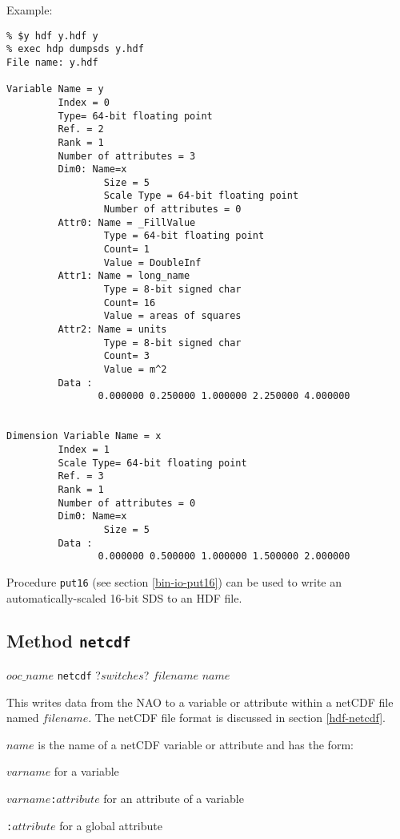 Example:
  \begin{verbatim}
% $y hdf y.hdf y
% exec hdp dumpsds y.hdf
File name: y.hdf 

Variable Name = y
         Index = 0
         Type= 64-bit floating point
         Ref. = 2
         Rank = 1
         Number of attributes = 3
         Dim0: Name=x
                 Size = 5
                 Scale Type = 64-bit floating point
                 Number of attributes = 0
         Attr0: Name = _FillValue
                 Type = 64-bit floating point 
                 Count= 1
                 Value = DoubleInf 
         Attr1: Name = long_name
                 Type = 8-bit signed char 
                 Count= 16
                 Value = areas of squares
         Attr2: Name = units
                 Type = 8-bit signed char 
                 Count= 3
                 Value = m^2
         Data : 
                0.000000 0.250000 1.000000 2.250000 4.000000 


Dimension Variable Name = x
         Index = 1
         Scale Type= 64-bit floating point
         Ref. = 3
         Rank = 1
         Number of attributes = 0
         Dim0: Name=x
                 Size = 5
         Data : 
                0.000000 0.500000 1.000000 1.500000 2.000000 
\end{verbatim}

Procedure \texttt{put16}
(see section  \ref{bin-io-put16})
 can be used to write an automatically-scaled 16-bit SDS to an HDF file.

\subsection{Method \texttt{netcdf}}
    \label{ooc-write-netcdf}

  $ooc\_name$ \texttt{netcdf} ?$switches$?  $filename$ $name$

This writes data from the NAO to a variable or attribute within a
  netCDF file named 
  $filename$.
The netCDF file format is discussed in section \ref{hdf-netcdf}.

  $name$ is the name of a netCDF variable or attribute and has
  the form:
\begin{bullets}
    \item $varname$ for a variable
    \item $varname$\texttt{:}$attribute$ for an attribute of a variable
    \item \texttt{:}$attribute$ for a global attribute
\end{bullets}

